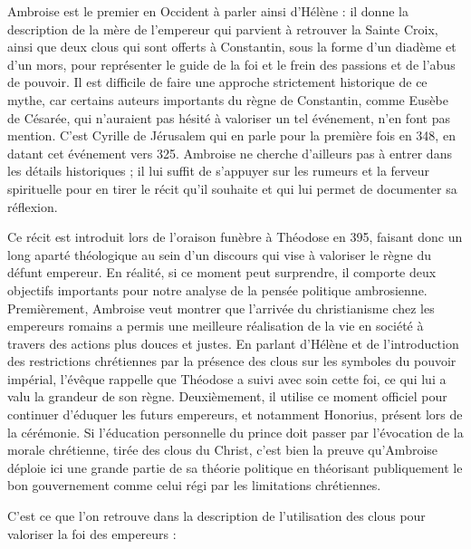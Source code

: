 \bigskip

Ambroise est le premier en Occident à parler ainsi d'Hélène : il donne la description de la mère de l'empereur qui parvient à retrouver la Sainte Croix, ainsi que deux clous qui sont offerts à Constantin, sous la forme d'un diadème et d'un mors, pour représenter le guide de la foi et le frein des passions et de l'abus de pouvoir. Il est difficile de faire une approche strictement historique de ce mythe, car certains auteurs importants du règne de Constantin, comme Eusèbe de Césarée, qui n'auraient pas hésité à valoriser un tel événement, n'en font pas mention. C'est Cyrille de Jérusalem qui en parle pour la première fois en 348, en datant cet événement vers 325\autocite[\nopp Introduction]{ambroise_mort_theodose}. Ambroise ne cherche d'ailleurs pas à entrer dans les détails historiques ; il lui suffit de s'appuyer sur les rumeurs et la ferveur spirituelle pour en tirer le récit qu'il souhaite et qui lui permet de documenter sa réflexion.

\bigskip

Ce récit est introduit lors de l'oraison funèbre à Théodose en 395, faisant donc un long aparté théologique au sein d'un discours qui vise à valoriser le règne du défunt empereur. En réalité, si ce moment peut surprendre, il comporte deux objectifs importants pour notre analyse de la pensée politique ambrosienne. Premièrement, Ambroise veut montrer que l'arrivée du christianisme chez les empereurs romains a permis une meilleure réalisation de la vie en société à travers des actions plus douces et justes. En parlant d'Hélène et de l'introduction des restrictions chrétiennes par la présence des clous sur les symboles du pouvoir impérial, l'évêque rappelle que Théodose a suivi avec soin cette foi, ce qui lui a valu la grandeur de son règne. Deuxièmement, il utilise ce moment officiel pour continuer d'éduquer les futurs empereurs, et notamment Honorius, présent lors de la cérémonie. Si l'éducation personnelle du prince doit passer par l'évocation de la morale chrétienne, tirée des clous du Christ, c'est bien la preuve qu'Ambroise déploie ici une grande partie de sa théorie politique en théorisant publiquement le bon gouvernement comme celui régi par les limitations chrétiennes.

\bigskip

C'est ce que l'on retrouve dans la description de l'utilisation des clous pour valoriser la foi des empereurs :

\bigskip

